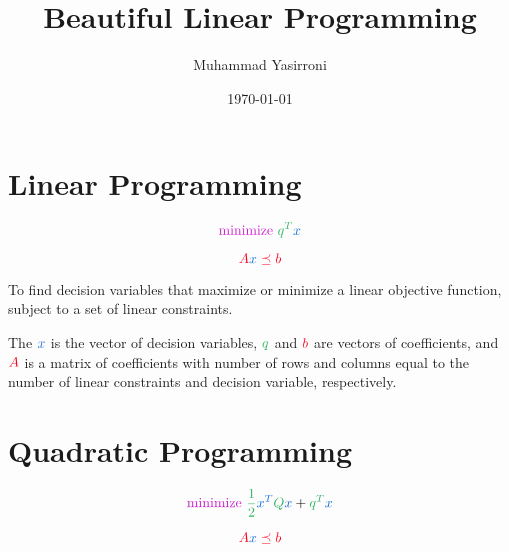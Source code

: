 \documentclass{article}
\title{Beautiful Linear Programming}
\author{Muhammad Yasirroni}
\date{\today}
\begin{document}
\maketitle

\section{Linear Programming}


\begin{equation}
    \textcolor{opt}{\text{minimize~}}
    \color{obj} q^T
    \color{var} x
    \color{eq}
\end{equation}

\begin{equation}
    \color{const} A
    \color{var} x
    \color{const} \preceq b
    \color{eq}
\end{equation}

To find \textcolor{var}{decision variables} that \textcolor{opt}{maximize or minimize} a \textcolor{obj}{linear objective function}, subject to a set of \textcolor{const}{linear constraints}.

The $\color{var} x$ is the vector of decision variables, $\color{obj} q$ and $\color{const} b$ are vectors of coefficients, and $\color{const} A$ is a matrix of coefficients with number of rows and columns equal to the number of \textcolor{const}{linear constraints} and \textcolor{var}{decision variable}, respectively.

\section{Quadratic Programming}


\begin{equation}
    \textcolor{opt}{\text{minimize~}}
    \color{obj} \frac{1}{2} 
    \color{var} x^T
    \color{obj} Q
    \color{var} x
    \color{eq} + 
    \color{obj} q^T
    \color{var} x
    \color{eq}
\end{equation}

\begin{equation}
    \color{const} A
    \color{var} x
    \color{const} \preceq b
    \color{eq}
\end{equation}
\end{document}
